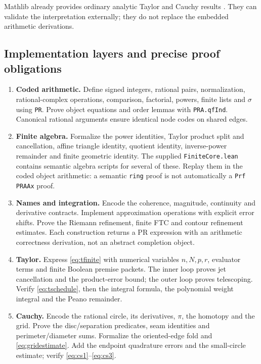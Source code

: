 \documentclass[11pt]{article}
\theoremstyle{definition}
\newcommand{\code}[1]{\texttt{#1}}
\begin{document}
Mathlib already provides ordinary analytic Taylor and Cauchy results
\cite{mathlibtaylor,mathlibcauchy}. They can validate the interpretation
externally; they do not replace the embedded arithmetic derivations.

\subsection{Implementation layers and precise proof obligations}

\begin{enumerate}[leftmargin=*]
 \item \textbf{Coded arithmetic.}
 Define signed integers, rational pairs, normalization, rational-complex
 operations, comparison, factorial, powers, finite lists and \(\sigma\)
 using \code{PR}. Prove object equations and order lemmas with
 \code{PRA.qfInd}. Canonical rational arguments ensure identical node
 codes on shared edges.

 \item \textbf{Finite algebra.}
 Formalize the power identities, Taylor product split and cancellation,
 affine triangle identity, quotient identity, inverse-power remainder
 and finite geometric identity. The supplied \code{FiniteCore.lean}
 contains semantic algebra scripts for several of these. Replay them
 in the coded object arithmetic: a semantic \code{ring} proof is not
 automatically a \code{Prf PRAAx} proof.

 \item \textbf{Names and integration.}
 Encode the coherence, magnitude, continuity and derivative contracts.
 Implement approximation operations with explicit error shifts.
 Prove the Riemann refinement, finite FTC and contour refinement
 estimates. Each construction returns a PR expression with an arithmetic
 correctness derivation, not an abstract completion object.

 \item \textbf{Taylor.}
 Express \eqref{eq:tfinite} with numerical variables \(n,N,p,r\),
 evaluator terms and finite Boolean premise packets. The inner loop
 proves jet cancellation and the product-error bound; the outer loop
 proves telescoping. Verify \eqref{eq:tschedule}, then the integral
 formula, the polynomial weight integral and the Peano remainder.

 \item \textbf{Cauchy.}
 Encode the rational circle, its derivatives, \(\pi\), the homotopy and
 the grid. Prove the disc/separation predicates, seam identities and
 perimeter/diameter sums. Formalize the oriented-edge fold and
 \eqref{eq:gridestimate}. Add the endpoint quadrature errors and the
 small-circle estimate; verify \eqref{eq:cs1}--\eqref{eq:cs3}.


\end{enumerate}
\end{document}
